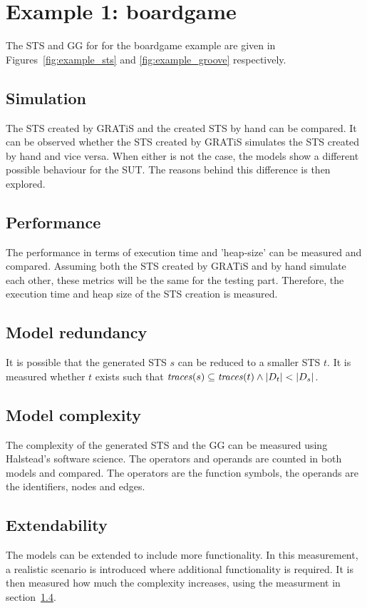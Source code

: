\section{Example 1: boardgame}
The STS and GG for for the boardgame example are given in Figures~\ref{fig:example_sts} and \ref{fig:example_groove} respectively. 

\subsection{Simulation}
The STS created by GRATiS and the created STS by hand can be compared. It can be observed whether the STS created by GRATiS simulates the STS created by hand and vice versa. When either is not the case, the models show a different possible behaviour for the SUT. The reasons behind this difference is then explored.

\subsection{Performance}
The performance in terms of execution time and 'heap-size' can be measured and compared. Assuming both the STS created by GRATiS and by hand simulate each other, these metrics will be the same for the testing part. Therefore, the execution time and heap size of the STS creation is measured.

\subsection{Model redundancy}
It is possible that the generated STS $s$ can be reduced to a smaller STS $t$. It is measured whether $t$ exists such that $\mathit{traces}(s) \subseteq \mathit{traces}(t) \land |D_t| < |D_s|$.

\subsection{Model complexity}\label{sec:complexity_measurement}
The complexity of the generated STS and the GG can be measured using Halstead's software science. The operators and operands are counted in both models and compared. The operators are the function symbols, the operands are the identifiers, nodes and edges. 

\subsection{Extendability}
The models can be extended to include more functionality. In this measurement, a realistic scenario is introduced where additional functionality is required. It is then measured how much the complexity increases, using the measurment in section~\ref{sec:complexity_measurement}.

